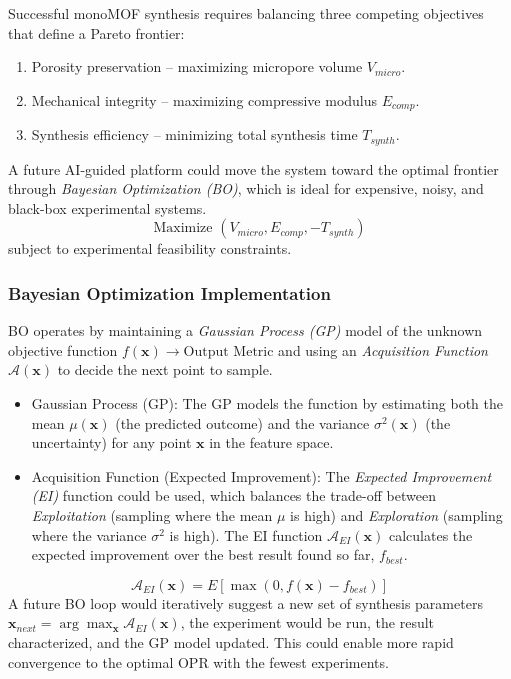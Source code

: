 \documentclass[12pt,a4paper]{article}
\begin{document}
Successful monoMOF synthesis requires balancing three competing objectives that define a Pareto frontier:
\begin{enumerate}
    \item Porosity preservation – maximizing micropore volume $V_{micro}$.
    \item Mechanical integrity – maximizing compressive modulus $E_{comp}$.
    \item Synthesis efficiency – minimizing total synthesis time $T_{synth}$.
\end{enumerate}
A future AI-guided platform could move the system toward the optimal frontier through \textit{Bayesian Optimization (BO)}, which is ideal for expensive, noisy, and black-box experimental systems.
\[
\text{Maximize } (V_{micro}, E_{comp}, -T_{synth})
\]
subject to experimental feasibility constraints.

\subsubsection{Bayesian Optimization Implementation}

BO operates by maintaining a \textit{Gaussian Process (GP)} model of the unknown objective function $f(\mathbf{x}) \rightarrow \text{Output Metric}$ and using an \textit{Acquisition Function} $\mathcal{A}(\mathbf{x})$ to decide the next point to sample.
\begin{itemize}
    \item Gaussian Process (GP): The GP models the function by estimating both the mean $\mu(\mathbf{x})$ (the predicted outcome) and the variance $\sigma^2(\mathbf{x})$ (the uncertainty) for any point $\mathbf{x}$ in the feature space.
    \item Acquisition Function (Expected Improvement): The \textit{Expected Improvement (EI)} function could be used, which balances the trade-off between \textit{Exploitation} (sampling where the mean $\mu$ is high) and \textit{Exploration} (sampling where the variance $\sigma^2$ is high). The EI function $\mathcal{A}_{EI}(\mathbf{x})$ calculates the expected improvement over the best result found so far, $f_{best}$.
\end{itemize}
\[
\mathcal{A}_{EI}(\mathbf{x}) = E[\max(0, f(\mathbf{x}) - f_{best})]
\]
A future BO loop would iteratively suggest a new set of synthesis parameters $\mathbf{x}_{next} = \arg \max_{\mathbf{x}} \mathcal{A}_{EI}(\mathbf{x})$, the experiment would be run, the result characterized, and the GP model updated. This could enable more rapid convergence to the optimal OPR with the fewest experiments.
\end{document}
